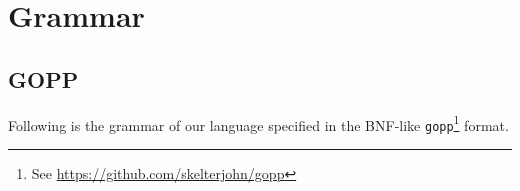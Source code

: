 \documentclass[10pt]{article}
\begin{document}
\section{Grammar}

\subsection{GOPP}

Following is the grammar of our language specified in the BNF-like
\texttt{gopp}\footnote{See \url{https://github.com/skelterjohn/gopp}} format.



%
%
%
%
%
%
%
%
%
%
%
%
%
%
%
%
%
%
%
%
%
%
\end{document}
